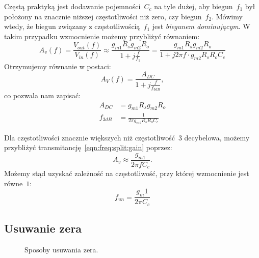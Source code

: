\documentclass[twoside,pl,final]{labman}
\begin{document}
Częstą praktyką jest dodawanie pojemności~$C_c$ na tyle dużej, aby biegun~$f_1$
był położony na znacznie niższej częstotliwości niż zero, czy biegun~$f_2$.
Mówimy wtedy, że biegun związany z częstotliwością~$f_1$ jest
\emph{biegunem dominującym}.
W takim przypadku wzmocnienie możemy przybliżyć równaniem:
\begin{equation}
  A_v(f) = \frac{V_{out}(f)}{V_{in}(f)} \approx
  \frac{g_{m1} R_s g_{m2} R_o}{1 + j \frac{f}{f_1}} =
  \frac{g_{m1} R_s g_{m2} R_o}{1 + j 2 \pi f \cdot g_{m2} R_s R_o C_c}
  \label{eqn:freq:split:gain}
\end{equation}
Otrzymujemy równanie w postaci:
\begin{equation}
  A_V(f) = \frac{A_{DC}}{1 + j \frac{f}{f_{3dB}}},
\end{equation}
co pozwala nam zapisać:
\begin{align}
  A_{DC} &= g_{m1} R_s g_{m2} R_o
  \label{eqn:freq:split:dcgain} \\
  f_{3dB} &= \frac{1}{2 \pi g_{m2} R_s R_o C_c}
  \label{eqn:freq:split:bw}
\end{align}

Dla częstotliwości znacznie większych niż częstotliwość~$3$ decybelowa,
możemy przybliżyć transmitancję~\ref{eqn:freq:split:gain} poprzez:
\begin{equation}
  A_v \approx \frac{g_{m1}}{2 \pi f C_c}.
\end{equation}
Możemy stąd uzyskać zależność na częstotliwość,
przy której wzmocnienie jest równe~$1$:
\begin{equation}
  f_{un} = \frac{g_m1}{2 \pi C_c}
  \label{eqn:freq:unity}
\end{equation}

\subsection{Usuwanie zera}
\label{freq:zero}

\begin{figure}[!htbp]
  \centering
  \qquad
  \caption{Sposoby usuwania zera.}
  \label{fig:zero:cancel}
\end{figure}
\end{document}
